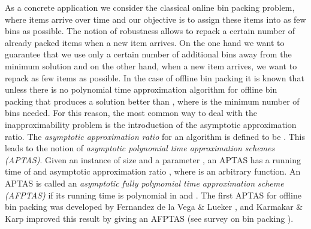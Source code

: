 \documentclass[a4paper,11pt]{article}
\begin{document}
As a concrete application we consider the classical online bin packing problem, 
where items arrive over time and our
objective is to assign these items into as few bins as
possible. The notion of robustness allows to repack a certain number of
already packed items when a new item arrives. 
On the one hand we want to guarantee that we use
only a certain number of additional bins away from the minimum solution
and on the other hand, when a new item arrives, we want to repack as few items as possible.
In the case of offline bin packing 
it is known that unless  there is no polynomial time approximation 
algorithm for offline bin packing that produces
a solution better than , where  is the minimum number
of bins needed. For this reason, the most common way to deal with the inapproximability problem is the 
introduction of the asymptotic approximation ratio. 
The \emph{asymptotic approximation ratio} for an algorithm  is defined to be .
This leads to the notion of \emph{asymptotic polynomial time approximation schemes (APTAS)}. 
Given an instance of size  and a 
parameter , an APTAS has a running time of  and 
asymptotic approximation
ratio , where  is an arbitrary function.
An APTAS is called an \emph{asymptotic fully polynomial time approximation scheme (AFPTAS)} if its
running time is polynomial in  and .
The first APTAS for offline bin packing was developed by Fernandez de la Vega \& Lueker \cite{de1981bin},
and Karmakar \& Karp improved this result by giving an AFPTAS \cite{karmarkar1982} (see survey on 
bin packing \cite{coffman1996}).
\end{document}
